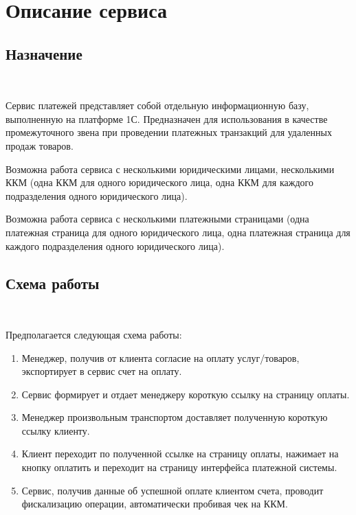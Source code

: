 \documentclass[11pt, a4paper]{article}
\begin{document}
	
\begin{spacing}{1.0}
	\tableofcontents
\end{spacing}
\clearpage

	
\section{Описание сервиса}

\subsection{Назначение}\

Сервис платежей представляет собой отдельную информационную базу, выполненную на платформе 1С. Предназначен для использования в качестве промежуточного звена при проведении платежных транзакций для удаленных продаж товаров.

Возможна работа сервиса с несколькими юридическими лицами, несколькими ККМ (одна ККМ для одного юридического лица, одна ККМ для каждого подразделения одного юридического лица).

Возможна работа сервиса с несколькими платежными страницами (одна платежная страница для одного юридического лица, одна платежная страница для каждого подразделения одного юридического лица).

\subsection{Схема работы}\

Предполагается следующая схема работы:

\begin{enumerate}
	\item Менеджер, получив от клиента согласие на оплату услуг/товаров, экспортирует в сервис счет на оплату.
	\item Сервис формирует и отдает менеджеру короткую ссылку на страницу оплаты.
	\item Менеджер произвольным транспортом доставляет полученную короткую ссылку клиенту.
	\item Клиент переходит по полученной ссылке на страницу оплаты, нажимает на кнопку оплатить и переходит на страницу интерфейса платежной системы.
	\item Сервис, получив данные об успешной оплате клиентом счета, проводит фискализацию операции, автоматически пробивая чек на ККМ.
\end{enumerate}
\end{document}

